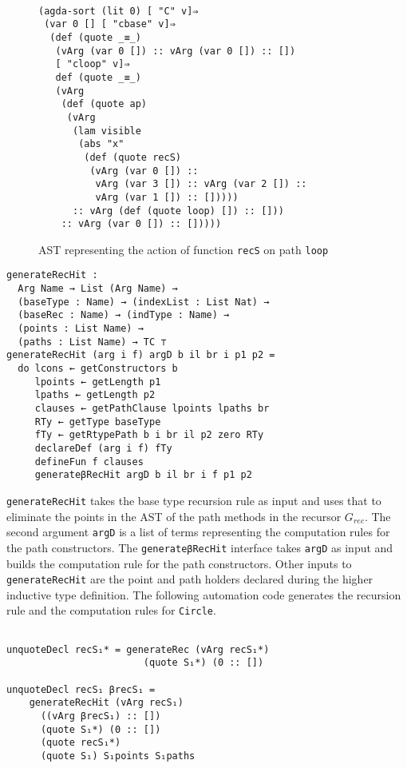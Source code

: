 \documentclass[sigplan,10pt]{acmart}
\begin{document}
\begin{figure}
\begin{center}
\begingroup
\fontsize{7pt}{9pt}\selectfont
\begin{Verbatim}[frame = single]

(agda-sort (lit 0) [ "C" v]⇒
 (var 0 [] [ "cbase" v]⇒
  (def (quote _≡_)
   (vArg (var 0 []) :: vArg (var 0 []) :: [])
   [ "cloop" v]⇒
   def (quote _≡_)
   (vArg
    (def (quote ap)
     (vArg
      (lam visible
       (abs "x"
        (def (quote recS)
         (vArg (var 0 []) ::
          vArg (var 3 []) :: vArg (var 2 []) :: 
          vArg (var 1 []) :: []))))
      :: vArg (def (quote loop) []) :: []))
    :: vArg (var 0 []) :: []))))

\end{Verbatim}
\endgroup
\end{center}
\caption{AST representing the action of function {\tt recS} on path {\tt loop}}
\label{fig:ast-beta-f}
\end{figure}

\begin{center}
\begingroup
\begin{BVerbatim}
generateRecHit : 
  Arg Name → List (Arg Name) →
  (baseType : Name) → (indexList : List Nat) →
  (baseRec : Name) → (indType : Name) →
  (points : List Name) → 
  (paths : List Name) → TC ⊤
generateRecHit (arg i f) argD b il br i p1 p2 =
  do lcons ← getConstructors b
     lpoints ← getLength p1
     lpaths ← getLength p2
     clauses ← getPathClause lpoints lpaths br
     RTy ← getType baseType
     fTy ← getRtypePath b i br il p2 zero RTy
     declareDef (arg i f) fTy
     defineFun f clauses
     generateβRecHit argD b il br i f p1 p2
\end{BVerbatim}
\endgroup
\end{center}

{\tt generateRecHit} takes the base type recursion rule as input and uses that to eliminate the points in the AST of the path methods in the recursor $G_{rec}$. The second argument {\tt argD} is a list of terms representing the computation rules for the path constructors. The {\tt generateβRecHit} interface takes {\tt argD} as input and builds the computation rule for the path constructors. Other inputs to {\tt generateRecHit} are the point and path holders declared during the higher inductive type definition. The following automation code generates the recursion rule and the computation rules for {\tt Circle}.

\begin{center}
\begingroup
\begin{BVerbatim}

unquoteDecl recS₁* = generateRec (vArg recS₁*)
                        (quote S₁*) (0 :: [])

unquoteDecl recS₁ βrecS₁ = 
    generateRecHit (vArg recS₁)
      ((vArg βrecS₁) :: [])
      (quote S₁*) (0 :: [])
      (quote recS₁*)
      (quote S₁) S₁points S₁paths
\end{BVerbatim}
\endgroup
\end{center}
\end{document}
